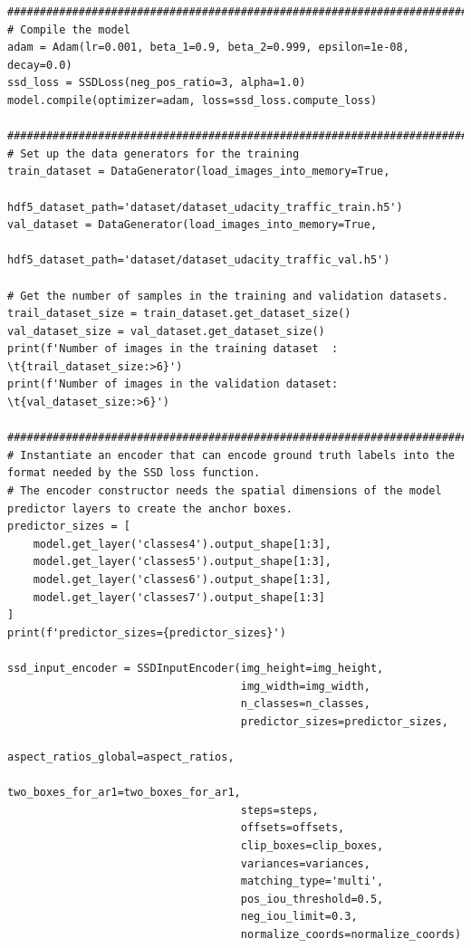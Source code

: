 \begin{lstlisting}
########################################################################################################################
# Compile the model
adam = Adam(lr=0.001, beta_1=0.9, beta_2=0.999, epsilon=1e-08, decay=0.0)
ssd_loss = SSDLoss(neg_pos_ratio=3, alpha=1.0)
model.compile(optimizer=adam, loss=ssd_loss.compute_loss)

########################################################################################################################
# Set up the data generators for the training
train_dataset = DataGenerator(load_images_into_memory=True,
                              hdf5_dataset_path='dataset/dataset_udacity_traffic_train.h5')
val_dataset = DataGenerator(load_images_into_memory=True,
                            hdf5_dataset_path='dataset/dataset_udacity_traffic_val.h5')

# Get the number of samples in the training and validation datasets.
trail_dataset_size = train_dataset.get_dataset_size()
val_dataset_size = val_dataset.get_dataset_size()
print(f'Number of images in the training dataset  : \t{trail_dataset_size:>6}')
print(f'Number of images in the validation dataset: \t{val_dataset_size:>6}')

########################################################################################################################
# Instantiate an encoder that can encode ground truth labels into the format needed by the SSD loss function.
# The encoder constructor needs the spatial dimensions of the model predictor layers to create the anchor boxes.
predictor_sizes = [
    model.get_layer('classes4').output_shape[1:3],
    model.get_layer('classes5').output_shape[1:3],
    model.get_layer('classes6').output_shape[1:3],
    model.get_layer('classes7').output_shape[1:3]
]
print(f'predictor_sizes={predictor_sizes}')

ssd_input_encoder = SSDInputEncoder(img_height=img_height,
                                    img_width=img_width,
                                    n_classes=n_classes,
                                    predictor_sizes=predictor_sizes,
                                    aspect_ratios_global=aspect_ratios,
                                    two_boxes_for_ar1=two_boxes_for_ar1,
                                    steps=steps,
                                    offsets=offsets,
                                    clip_boxes=clip_boxes,
                                    variances=variances,
                                    matching_type='multi',
                                    pos_iou_threshold=0.5,
                                    neg_iou_limit=0.3,
                                    normalize_coords=normalize_coords)


\end{lstlisting}

